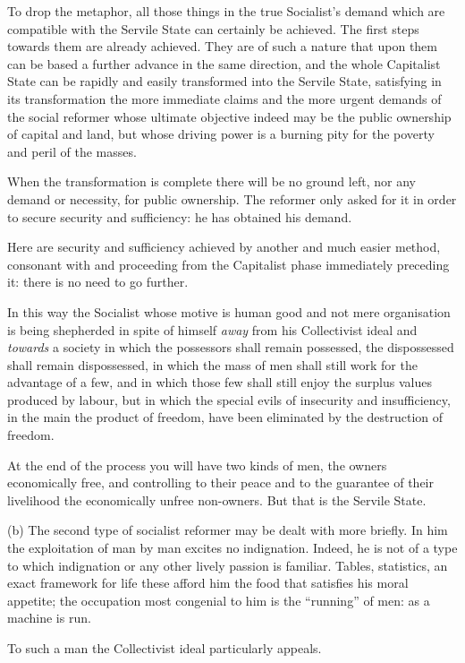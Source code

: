 \documentclass{book}
\begin{document}
To drop the metaphor, all those things in the true Socialist’s demand which are compatible with the Servile State can certainly be achieved. The first steps towards them are already achieved. They are of such a nature that upon them can be based a further advance in the same direction, and the whole Capitalist State can be rapidly and easily transformed into the Servile State, satisfying in its transformation the more immediate claims and the more urgent demands of the social reformer whose ultimate objective indeed may be the public ownership of capital and land, but whose driving power is a burning pity for the poverty and peril of the masses.

When the transformation is complete there will be no ground left, nor any demand or necessity, for public ownership. The reformer only asked for it in order to secure security and sufficiency: he has obtained his demand.

Here are security and sufficiency achieved by another and much easier method, consonant with and proceeding from the Capitalist phase immediately preceding it: there is no need to go further.

In this way the Socialist whose motive is human good and not mere organisation is being shepherded in spite of himself \emph{away} from his Collectivist ideal and \emph{towards} a society in which the possessors shall remain possessed, the dispossessed shall remain dispossessed, in which the mass of men shall still work for the advantage of a few, and in which those few shall still enjoy the surplus values produced by labour, but in which the special evils of insecurity and insufficiency, in the main the product of freedom, have been eliminated by the destruction of freedom.

At the end of the process you will have two kinds of men, the owners economically free, and controlling to their peace and to the guarantee of their livelihood the economically unfree non-owners. But that is the Servile State.

(b) The second type of socialist reformer may be dealt with more briefly. In him the exploitation of man by man excites no indignation. Indeed, he is not of a type to which indignation or any other lively passion is familiar. Tables, statistics, an exact framework for life these afford him the food that satisfies his moral appetite; the occupation most congenial to him is the “running” of men: as a machine is run.

To such a man the Collectivist ideal particularly appeals.
\end{document}
